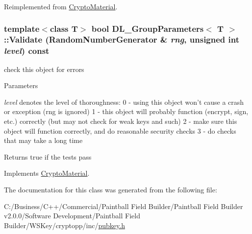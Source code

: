 Reimplemented from \hyperlink{class_crypto_material_a64ab4ff4adfcfc2da59706ac32895b50}{CryptoMaterial}.\hypertarget{class_d_l___group_parameters_aa2b615bc7ed3561914a27a8c456258aa}{
\subsubsection[{Validate}]{\setlength{\rightskip}{0pt plus 5cm}template$<$class T$>$ bool {\bf DL\_\-GroupParameters}$<$ T $>$::Validate ({\bf RandomNumberGenerator} \& {\em rng}, \/  unsigned int {\em level}) const}}
\label{class_d_l___group_parameters_aa2b615bc7ed3561914a27a8c456258aa}


check this object for errors 
\begin{DoxyParams}{Parameters}
\item[{\em level}]denotes the level of thoroughness: 0 -\/ using this object won't cause a crash or exception (rng is ignored) 1 -\/ this object will probably function (encrypt, sign, etc.) correctly (but may not check for weak keys and such) 2 -\/ make sure this object will function correctly, and do reasonable security checks 3 -\/ do checks that may take a long time \end{DoxyParams}
\begin{DoxyReturn}{Returns}
true if the tests pass 
\end{DoxyReturn}


Implements \hyperlink{class_crypto_material_aaa7d67d0c12712de0e33713c73f5b718}{CryptoMaterial}.

The documentation for this class was generated from the following file:\begin{DoxyCompactItemize}
\item 
C:/Business/C++/Commercial/Paintball Field Builder/Paintball Field Builder v2.0.0/Software Development/Paintball Field Builder/WSKey/cryptopp/inc/\hyperlink{pubkey_8h}{pubkey.h}\end{DoxyCompactItemize}

